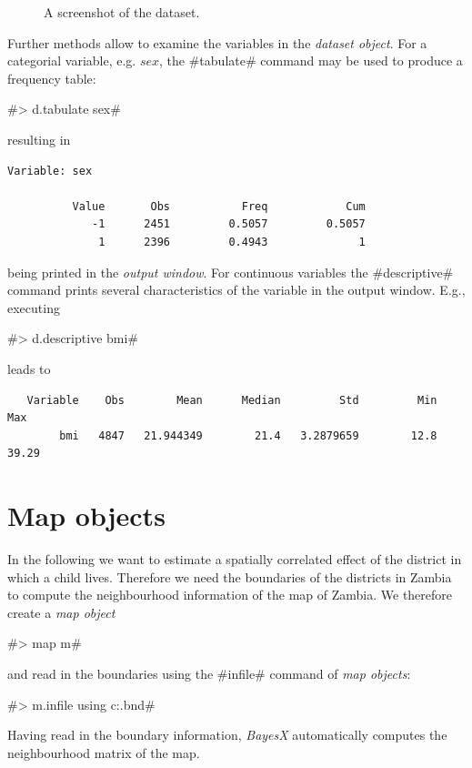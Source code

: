 \documentclass{article}
\begin{document}
\begin{figure}[ht]
\begin{center}
 {\it\caption{A
screenshot of the dataset.\label{screenshot}}}
\end{center}
\end{figure}

Further methods allow to examine the variables in the {\it dataset
object}. For a categorial variable, e.g. $sex$, the #tabulate#
command may be used to produce a frequency table:

#> d.tabulate sex#

resulting in

\begin{verbatim}
Variable: sex

          Value       Obs           Freq            Cum
             -1      2451         0.5057         0.5057
              1      2396         0.4943              1
\end{verbatim}

being printed in the {\it output window}. For continuous variables
the #descriptive# command prints several characteristics of the
variable in the {output window}. E.g., executing

#> d.descriptive bmi#

leads to

\begin{verbatim}
   Variable    Obs        Mean      Median         Std         Min         Max
        bmi   4847   21.944349        21.4   3.2879659        12.8       39.29
\end{verbatim}

\section{Map objects}\label{maps}

In the following we want to estimate a spatially correlated effect
of the district in which a child lives. Therefore we need the
boundaries of the districts in Zambia to compute the neighbourhood
information of the map of Zambia. We therefore create a {\it map
object}

#> map m#

and read in the boundaries using the #infile# command of {\it map
objects}:

#> m.infile using c:\data\zambia.bnd#

Having read in the boundary information, {\it BayesX}
automatically computes the neighbourhood matrix of the map.
\end{document}
